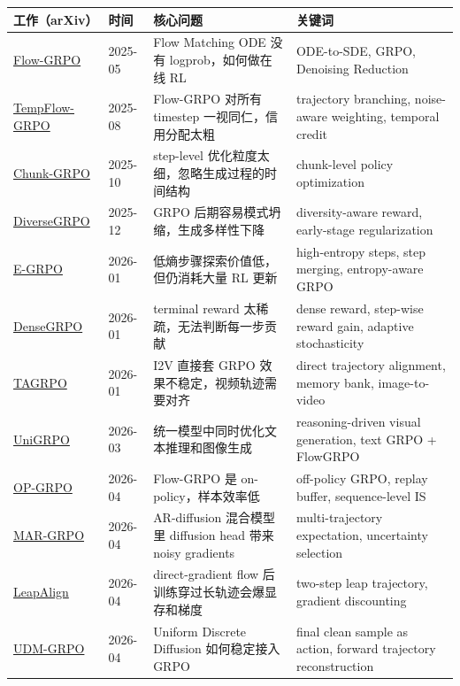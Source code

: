 \begin{center}
{\small
\begin{tabular}{p{2.7cm}p{2.1cm}p{4.2cm}p{4.2cm}}
\hline
\textbf{工作（arXiv）} & \textbf{时间} & \textbf{核心问题} & \textbf{关键词} \\
\hline
\href{https://arxiv.org/abs/2505.05470}{Flow-GRPO}
&
2025-05
&
Flow Matching ODE 没有 logprob，如何做在线 RL
&
ODE-to-SDE, GRPO, Denoising Reduction
\\
\href{https://arxiv.org/abs/2508.04324}{TempFlow-GRPO}
&
2025-08
&
Flow-GRPO 对所有 timestep 一视同仁，信用分配太粗
&
trajectory branching, noise-aware weighting, temporal credit
\\
\href{https://arxiv.org/abs/2510.21583}{Chunk-GRPO}
&
2025-10
&
step-level 优化粒度太细，忽略生成过程的时间结构
&
chunk-level policy optimization
\\
\href{https://arxiv.org/abs/2512.21514}{DiverseGRPO}
&
2025-12
&
GRPO 后期容易模式坍缩，生成多样性下降
&
diversity-aware reward, early-stage regularization
\\
\href{https://arxiv.org/abs/2601.00423}{E-GRPO}
&
2026-01
&
低熵步骤探索价值低，但仍消耗大量 RL 更新
&
high-entropy steps, step merging, entropy-aware GRPO
\\
\href{https://arxiv.org/abs/2601.20218}{DenseGRPO}
&
2026-01
&
terminal reward 太稀疏，无法判断每一步贡献
&
dense reward, step-wise reward gain, adaptive stochasticity
\\
\href{https://arxiv.org/abs/2601.05729}{TAGRPO}
&
2026-01
&
I2V 直接套 GRPO 效果不稳定，视频轨迹需要对齐
&
direct trajectory alignment, memory bank, image-to-video
\\
\href{https://arxiv.org/abs/2603.23500}{UniGRPO}
&
2026-03
&
统一模型中同时优化文本推理和图像生成
&
reasoning-driven visual generation, text GRPO + FlowGRPO
\\
\href{https://arxiv.org/abs/2604.04142}{OP-GRPO}
&
2026-04
&
Flow-GRPO 是 on-policy，样本效率低
&
off-policy GRPO, replay buffer, sequence-level IS
\\
\href{https://arxiv.org/abs/2604.06966}{MAR-GRPO}
&
2026-04
&
AR-diffusion 混合模型里 diffusion head 带来 noisy gradients
&
multi-trajectory expectation, uncertainty selection
\\
\href{https://arxiv.org/abs/2604.15311}{LeapAlign}
&
2026-04
&
direct-gradient flow 后训练穿过长轨迹会爆显存和梯度
&
two-step leap trajectory, gradient discounting
\\
\href{https://arxiv.org/abs/2604.18518}{UDM-GRPO}
&
2026-04
&
Uniform Discrete Diffusion 如何稳定接入 GRPO
&
final clean sample as action, forward trajectory reconstruction
\\
\hline
\end{tabular}
}
\end{center}

